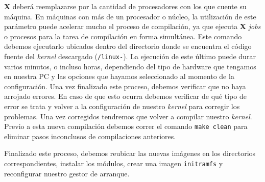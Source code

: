 \begin{questions}
  \textbf{X} deberá reemplazarse por la cantidad de procesadores con los
  que cuente su máquina. En máquinas con más de un procesador o núcleo, la
  utilización de este parámetro puede acelerar mucho el proceso de
  compilación, ya que ejecuta \textbf{X} \textit{jobs} o procesos para la
  tarea de compilación en forma simultánea. Este comando debemos ejecutarlo
  ubicados dentro del directorio donde se encuentra el código fuente del
  \textit{kernel} descargado
  (\texttt{\KERNELSOURCEPATH/linux-\KERNELBASEVERSION}). La ejecución de
  este último puede durar varios minutos, o incluso horas, dependiendo del
  tipo de hardware que tengamos en nuestra PC y las opciones que hayamos
  seleccionado al momento de la configuración. Una vez finalizado este
  proceso, debemos verificar que no haya arrojado errores. En caso de que
  esto ocurra debemos verificar de qué tipo de error se trata y volver a la
  configuración de nuestro \textit{kernel} para corregir los problemas. Una
  vez corregidos tendremos que volver a compilar nuestro
  \textit{kernel}. Previo a esta nueva compilación debemos correr el
  comando \texttt{make clean} para eliminar pasos inconclusos de
  compilaciones anteriores.

  \question Finalizado este proceso, debemos reubicar las nuevas imágenes
  en los directorios correspondientes, instalar los módulos, crear una
  imagen \texttt{initramfs} y reconfigurar nuestro gestor de arranque.
\end{questions}
